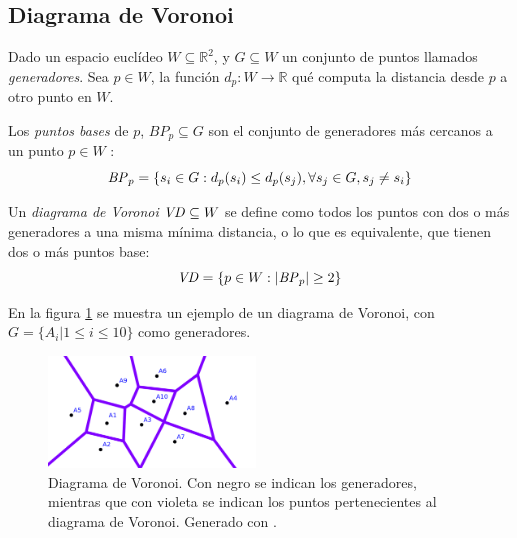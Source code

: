 \subsection{Diagrama de Voronoi}\label{sec:VD}
Dado un espacio euclídeo $W \subseteq \mathds{R}^2$, y $G \subseteq W$ un conjunto de puntos llamados \emph{generadores}. Sea $p\in W$, la función $d_p : W \rightarrow \mathds{R}$ qué computa la distancia desde $p$ a otro punto en $W$. 

Los \emph{puntos bases} de $p$, $BP_p \subseteq G$ son el conjunto de generadores más cercanos a un punto $p \in W$ :
\begin{equation}
  \mathit{BP}_p =\{s_i \in G : d_p(s_i) \leq d_p(s_j), \forall s_j\in G,s_j \neq s_i\}\label{eq:bases}
\end{equation}

Un \emph{diagrama de Voronoi} $\mathit{VD}\subseteq W$ se define como todos los puntos con dos o más generadores a una misma mínima distancia, o lo que es equivalente, que tienen dos o más puntos base: 
\begin{equation}
  \mathit{VD} = \{p \in W : |\mathit{BP}_p| \geq 2\}\label{eq:VD}
\end{equation}


En la figura \ref{fig:ejemploVoronoi} se muestra un ejemplo de un diagrama de Voronoi, con $G=\{A_i | 1\leq i \leq 10\}$ como generadores.
\begin{figure}[H]
  \center
  \includegraphics[width=5.5cm]{imagenes/VD.png}
  \caption[Diagrama de Voronoi.]{Diagrama de Voronoi. Con negro se indican los generadores, mientras que con violeta se indican los puntos pertenecientes al diagrama de Voronoi. Generado con \cite{voronoigeo}.}\label{fig:ejemploVoronoi}
\end{figure} 

